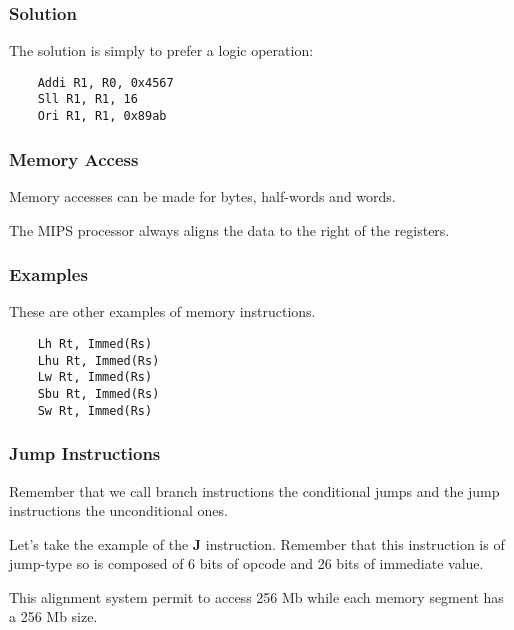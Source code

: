 
\begin{frame}[containsverbatim]
  \frametitle{Solution}

  The solution is simply to prefer a logic operation:

  \begin{verbatim}
    Addi R1, R0, 0x4567
    Sll R1, R1, 16
    Ori R1, R1, 0x89ab
  \end{verbatim}
\end{frame}


\begin{frame}
  \frametitle{Memory Access}

  Memory accesses can be made for bytes, half-words and words.

  \nl

  The MIPS processor always aligns the data to the right of the registers.

  \begin{center}
  \end{center}
\end{frame}


\begin{frame}[containsverbatim]
  \frametitle{Examples}

  These are other examples of memory instructions.

  \begin{verbatim}
    Lh Rt, Immed(Rs)
    Lhu Rt, Immed(Rs)
    Lw Rt, Immed(Rs)
    Sbu Rt, Immed(Rs)
    Sw Rt, Immed(Rs)
  \end{verbatim}
\end{frame}


\begin{frame}
  \frametitle{Jump Instructions}

  Remember that we call branch instructions the conditional jumps
  and the jump instructions the unconditional ones.

  \nl

  Let's take the example of the \textbf{J} instruction. Remember that
  this instruction is of jump-type so is composed of 6 bits of opcode
  and 26 bits of immediate value.

  \begin{center}
  \end{center}

  This alignment system permit to access 256 Mb while each memory segment
  has a 256 Mb size.
\end{frame}

